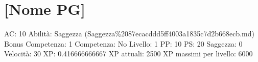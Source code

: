 \section{{[}Nome PG{]}}\label{nome-pg}

AC: 10 Abilità: Saggezza
(Saggezza\%2087ecacddd5ff4003a1835c7d2b668ecb.md) Bonus Competenza: 1
Competenza: No Livello: 1 PP: 10 PS: 20 Saggezza: 0 Velocità: 30 XP:
0.416666666667 XP attuali: 2500 XP massimi per livello: 6000
